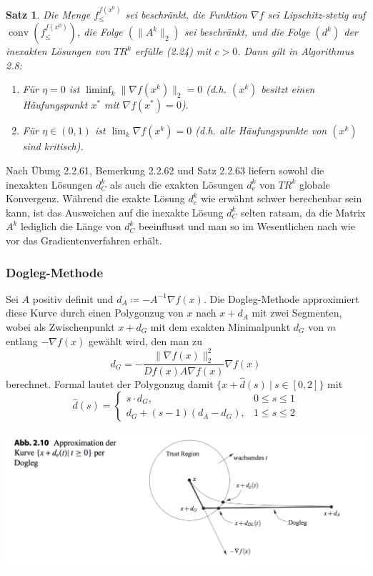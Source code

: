 \documentclass[11pt]{scrreprt}
\newcounter{thm}
\theoremstyle{thmstyle}
\numberwithin{thm}{section}
\newtheorem{satz}[thm]{Satz}
\begin{document}
\begin{satz}
	Die Menge $f_{\leq}^{f(x^0)}$ sei beschränkt, die Funktion $\nabla f$ sei Lipschitz-stetig auf $\operatorname{conv}(f_{\leq}^{f(x^0)})$, die Folge $(\|A^k\|_2)$ sei beschränkt, und die Folge $(d^k)$ der inexakten Lösungen von $TR^k$ erfülle (2.24) mit $c > 0$. Dann gilt in Algorithmus 2.8:
	\begin{enumerate}[label=\alph*\upshape)]
		\item Für $\eta = 0$ ist $\liminf_k \| \nabla f(x^k) \|_2 = 0$ (d.h. $(x^k)$ besitzt einen Häufungspunkt $x^*$ mit $\nabla f(x^*) = 0$).
		\item Für $\eta \in (0, 1)$ ist $\lim_k  \nabla f(x^k) = 0$ (d.h. alle Häufungspunkte von $(x^k)$ sind kritisch).
	\end{enumerate}
\end{satz}

Nach Übung 2.2.61, Bemerkung 2.2.62 und Satz 2.2.63 liefern sowohl die inexakten Lösungen $d_C^k$ als auch die exakten Lösungen $d_e^k$ von $TR^k$ globale Konvergenz. Während die exakte Lösung $d_e^k$ wie erwähnt schwer berechenbar sein kann, ist das Ausweichen auf die inexakte Lösung $d_C^k$ selten ratsam, da die Matrix $A^k$ lediglich die Länge von $d_C^k$ beeinflusst und man so im Wesentlichen nach wie vor das Gradientenverfahren erhält.

\subsubsection*{Dogleg-Methode}

Sei $A$ positiv definit und $d_A \coloneqq - A^{-1} \nabla f(x)$. Die Dogleg-Methode approximiert diese Kurve durch einen Polygonzug von $x$ nach $x+d_A$ mit zwei Segmenten, wobei als Zwischenpunkt $x+d_G$ mit dem exakten Minimalpunkt $d_G$ von $m$ entlang $-\nabla f(x)$ gewählt wird, den man zu
$$ d_G = - \frac{\| \nabla f(x) \|_2^2}{D f(x) A \nabla f(x)} \nabla f(x) $$
berechnet. Formal lautet der Polygonzug damit $\{ x + \hat{d}(s) ~|~ s \in [0, 2] \}$ mit
$$ \hat{d}(s) = \begin{cases}
	s \cdot d_G, & 0 \leq s \leq 1 \\ d_G + (s-1) (d_A - d_G), & 1 \leq s \leq 2
\end{cases} $$

\begin{center}
	\includegraphics[scale=0.5]{ab210}
\end{center}
\end{document}
